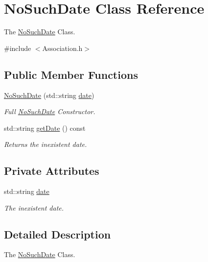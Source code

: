 \hypertarget{classNoSuchDate}{}\section{No\+Such\+Date Class Reference}
\label{classNoSuchDate}


The \mbox{\hyperlink{classNoSuchDate}{No\+Such\+Date}} Class.  




{\ttfamily \#include $<$Association.\+h$>$}

\subsection*{Public Member Functions}
\begin{DoxyCompactItemize}
\item 
\mbox{\hyperlink{classNoSuchDate_a0cad1c9e0d0a034a885b2529d6f79811}{No\+Such\+Date}} (std\+::string \mbox{\hyperlink{classNoSuchDate_af3b260da65ff8089d325b948e895f6b3}{date}})
\begin{DoxyCompactList}\small\item\em Full \mbox{\hyperlink{classNoSuchDate}{No\+Such\+Date}} Constructor. \end{DoxyCompactList}\item 
std\+::string \mbox{\hyperlink{classNoSuchDate_ad78fefa7d990af927c46096722a00f2c}{get\+Date}} () const
\begin{DoxyCompactList}\small\item\em Returns the inexistent date. \end{DoxyCompactList}\end{DoxyCompactItemize}
\subsection*{Private Attributes}
\begin{DoxyCompactItemize}
\item 
std\+::string \mbox{\hyperlink{classNoSuchDate_af3b260da65ff8089d325b948e895f6b3}{date}}
\begin{DoxyCompactList}\small\item\em The inexistent date. \end{DoxyCompactList}\end{DoxyCompactItemize}


\subsection{Detailed Description}
The \mbox{\hyperlink{classNoSuchDate}{No\+Such\+Date}} Class. 

